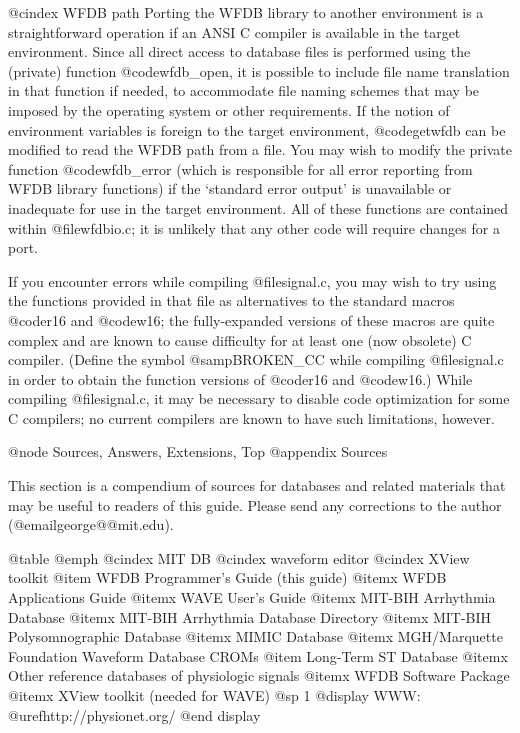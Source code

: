 {{{{{{{{@cindex WFDB path
Porting the WFDB library to another environment is a straightforward
operation if an ANSI C compiler is available in the target environment.
Since all direct access to database files is performed using the
(private) function @code{wfdb_open}, it is possible to include file name
translation in that function if needed, to accommodate file naming
schemes that may be imposed by the operating system or other
requirements.  If the notion of environment variables is foreign to the
target environment, @code{getwfdb} can be modified to read the WFDB path
from a file.  You may wish to modify the private function
@code{wfdb_error} (which is responsible for all error reporting from WFDB
library functions) if the `standard error output' is unavailable or
inadequate for use in the target environment.  All of these functions are
contained within @file{wfdbio.c}; it is unlikely that any other code will
require changes for a port.

If you encounter errors while compiling @file{signal.c}, you may wish to try
using the functions provided in that file as alternatives to the standard
macros @code{r16} and @code{w16}; the fully-expanded versions of these macros
are quite complex and are known to cause difficulty for at least one (now
obsolete) C compiler.  (Define the symbol @samp{BROKEN_CC} while compiling
@file{signal.c} in order to obtain the function versions of @code{r16} and
@code{w16}.)  While compiling @file{signal.c}, it may be necessary to disable
code optimization for some C compilers;  no current compilers are known to
have such limitations, however.

@node     Sources, Answers, Extensions, Top
@appendix Sources

This section is a compendium of sources for databases and related
materials that may be useful to readers of this guide.  Please send any
corrections to the author (@email{george@@mit.edu}).

@table @emph
@cindex MIT DB
@cindex waveform editor
@cindex XView toolkit
@item WFDB Programmer's Guide (this guide)
@itemx WFDB Applications Guide
@itemx WAVE User's Guide
@itemx MIT-BIH Arrhythmia Database
@itemx MIT-BIH Arrhythmia Database Directory
@itemx MIT-BIH Polysomnographic Database
@itemx MIMIC Database
@itemx MGH/Marquette Foundation Waveform Database CROMs
@item Long-Term ST Database
@itemx Other reference databases of physiologic signals
@itemx WFDB Software Package
@itemx XView toolkit (needed for WAVE)
@sp 1
@display
WWW: @uref{http://physionet.org/}
@end display

}}}}}}}}
